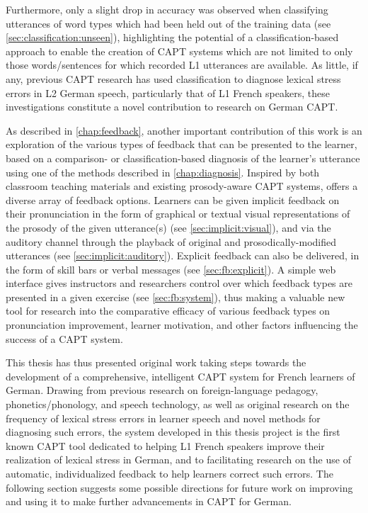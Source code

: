 	Furthermore, 
	only a slight drop in accuracy was observed when classifying utterances of word types which had been held out of the training data
	(see \cref{sec:classification:unseen}), highlighting the potential of a classification-based approach to enable the creation of CAPT systems which are not limited to only those words/sentences for which recorded L1 utterances are available.
	As little, if any, previous CAPT research has used classification to diagnose lexical stress errors in L2 German speech, particularly that of L1 French speakers, these investigations constitute 
	a novel contribution
	to research on German CAPT.




%
As described in \cref{chap:feedback}, another important contribution of this work is an exploration of the various types of feedback that can be presented to the learner, based on a comparison- or classification-based diagnosis of the learner's utterance using one of the methods described in \cref{chap:diagnosis}. 
	Inspired by both classroom teaching materials and existing prosody-aware CAPT systems,  offers a diverse array of feedback options. Learners can be given implicit feedback on their pronunciation in the form of graphical or textual visual representations of the prosody of the given utterance(s) (see \cref{sec:implicit:visual}), and via the auditory channel through the playback of original and prosodically-modified utterances (see \cref{sec:implicit:auditory}).
	Explicit feedback can also be delivered, in the form of skill bars %
	or verbal messages %
	(see \cref{sec:fb:explicit}).
	A simple web interface gives  instructors and researchers control over which feedback types are presented in a given exercise (see \cref{sec:fb:system}), thus making  a valuable new tool for research into the comparative efficacy of various feedback types on pronunciation improvement, learner motivation, and other factors influencing the success of a CAPT system. 



%
This thesis has thus presented original work taking steps towards the development of a comprehensive, intelligent CAPT system for French learners of German. Drawing from previous research on foreign-language pedagogy, phonetics/phonology, and speech technology, as well as original research on the frequency of lexical stress errors in learner speech and novel methods for diagnosing such errors, the  system developed in this thesis project is the first known CAPT tool dedicated to helping L1 French speakers improve their realization of lexical stress in German, and to facilitating research on the use of automatic, individualized feedback to help learners correct such errors. The following section suggests some possible directions for future work on improving  and using it to make further advancements in CAPT for German.


